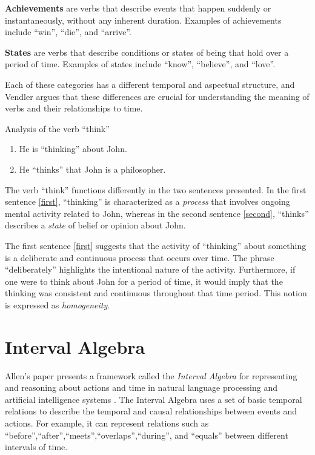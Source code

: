 \textbf{Achievements} are verbs that describe events that happen suddenly or instantaneously, without any inherent duration. Examples of achievements include ``win'', ``die'', and ``arrive''.


\textbf{States} are verbs that describe conditions or states of being that hold over a period of time. Examples of states include ``know'', ``believe'', and ``love''.

Each of these categories has a different temporal and aspectual structure, and Vendler argues that these differences are crucial for understanding the meaning of verbs and their relationships to time.



\begin{exmp} Analysis of the verb ``think''
	\begin{enumerate}
		\item He is ``thinking'' about John. \label{first}
		\item He ``thinks'' that John is a philosopher. \label{second}
	\end{enumerate}

	The verb ``think'' functions differently in the two sentences presented. In the first sentence \ref{first}, ``thinking'' is characterized as a \textit{process} that involves ongoing mental activity related to John, whereas in the second sentence \ref{second}, ``thinks'' describes a \textit{state} of belief or opinion about John.

	The first sentence \ref{first} suggests that the activity of ``thinking'' about something is a deliberate and continuous process that occurs over time. The phrase ``deliberately'' highlights the intentional nature of the activity. Furthermore, if one were to think about John for a period of time, it would imply that the thinking was consistent and continuous throughout that time period. This notion is expressed as \textit{homogeneity}.
\end{exmp}


\section{Interval Algebra}

Allen's paper presents a framework called the \textit{Interval Algebra} for representing and reasoning about actions and time in natural language processing and artificial intelligence systems \cite{allen1984towards}. The Interval Algebra uses a set of basic temporal relations to describe the temporal and causal relationships between events and actions. For example, it can represent relations such as ``before'',``after'',``meets'',``overlaps'',``during'', and ``equals'' between different intervals of time.

